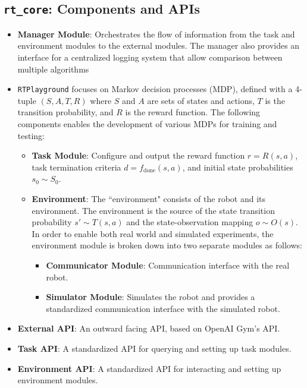 \documentclass{article}
\begin{document}
\subsection{\texttt{rt\_core}: Components and APIs}

\begin{itemize}[nolistsep]
    \item \textbf{Manager Module}: Orchestrates the flow of information from the task and environment modules to the external modules. The manager also provides an interface for a centralized logging system that allow comparison between multiple algorithms
    \item \texttt{RTPlayground} focuses on Markov decision processes (MDP), defined with a 4-tuple $(S, A, T, R)$ where $S$ and $A$ are sets of states and actions, $T$ is the transition probability, and $R$ is the reward function. The following components enables the development of various MDPs for training and testing:
        \begin{itemize}[nolistsep]
            \item \textbf{Task Module}: Configure and output the reward function $r = R(s,a)$, task termination criteria $d = f_{\text{done}}(s,a)$, and initial state probabilities $s_0 \sim S_0$.
            \item \textbf{Environment}: The ``environment" consists of the robot and its environment. The environment is the source of the state transition probability $s' \sim T(s, a)$ and the state-observation mapping $o \sim O(s)$. In order to enable both real world and simulated experiments, the environment module is broken down into two separate modules as follows:
                \begin{itemize}[nolistsep]
                    \item \textbf{Communicator Module}: Communication interface with the real robot.
                    \item \textbf{Simulator Module}: Simulates the robot and provides a standardized communication interface with the simulated robot.
                \end{itemize}
        \end{itemize}
    \item \textbf{External API}: An outward facing API, based on OpenAI Gym's API.
    \item \textbf{Task API}: A standardized API for querying and setting up task modules.
    \item \textbf{Environment API}: A standardized API for interacting and setting up environment modules.
\end{itemize}
\end{document}

